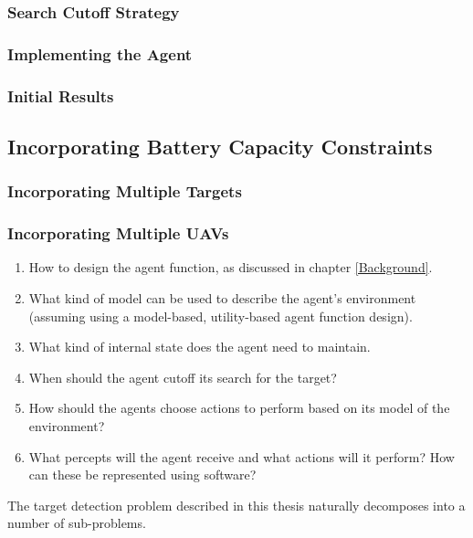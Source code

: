 \subsubsection{Search Cutoff Strategy}
\placeholder


\subsubsection{Implementing the Agent}
\placeholder

\subsubsection{Initial Results}
\placeholder

\subsection{Incorporating Battery Capacity Constraints}
\placeholder

\subsubsection{Incorporating Multiple Targets}
\placeholder

\subsubsection{Incorporating Multiple UAVs}
\placeholder



\begin{enumerate}
    \item How to design the agent function, as discussed in chapter \ref{Background}.
    \item What kind of model can be used to describe the agent's environment (assuming using a model-based, utility-based agent function design).
    \item What kind of internal state does the agent need to maintain.
    \item When should the agent cutoff its search for the target?
    \item How should the agents choose actions to perform based on its model of the environment?
    \item What percepts will the agent receive and what actions will it perform? How can these be represented using software?
\end{enumerate}

The target detection problem described in this thesis naturally decomposes into a number of sub-problems. %

